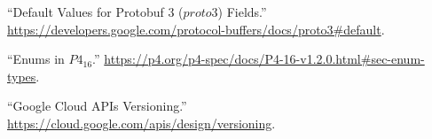 \documentclass[11pt]{article}
\begin{document}
{{\begin{thebibliography}{39}
\mdbibitemlabel{{}[4]}\textquotedblleft{}Default Values for Protobuf 3 ($proto3$) Fields.\textquotedblright{} \href{https://developers.google.com/protocol-buffers/docs/proto3\%23default}{{\ttfamily https://\hspace{0pt}developers.\hspace{0pt}google.\hspace{0pt}com/\hspace{0pt}protocol-\hspace{0pt}buffers/\hspace{0pt}docs/\hspace{0pt}proto3\#\hspace{0pt}default}}.\label{protodefaults}%

\mdbibitemlabel{{}[5]}\textquotedblleft{}Enums in $P4_{16}$.\textquotedblright{} \href{https://p4.org/p4-spec/docs/P4-16-v1.2.0.html\%23sec-enum-types}{{\ttfamily https://\hspace{0pt}p4.\hspace{0pt}org/\hspace{0pt}p4-\hspace{0pt}spec/\hspace{0pt}docs/\hspace{0pt}P4-\hspace{0pt}16-\hspace{0pt}v1.\hspace{0pt}2.\hspace{0pt}0.\hspace{0pt}html\#\hspace{0pt}sec-\hspace{0pt}enum-\hspace{0pt}types}}.\label{p4enums}%

\mdbibitemlabel{{}[6]}\textquotedblleft{}Google Cloud APIs Versioning.\textquotedblright{} \href{https://cloud.google.com/apis/design/versioning}{{\ttfamily https://\hspace{0pt}cloud.\hspace{0pt}google.\hspace{0pt}com/\hspace{0pt}apis/\hspace{0pt}design/\hspace{0pt}versioning}}.\label{apiversioning}%


\end{thebibliography}}}
\end{document}
